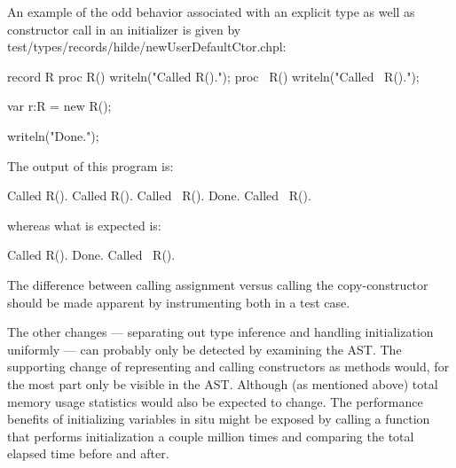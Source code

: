 An example of the odd behavior associated with an explicit type as well as constructor
call in an initializer is given by test/types/records/hilde/newUserDefaultCtor.chpl:
\begin{chapel}
record R
{
  proc R() { writeln("Called R()."); }
  proc ~R() { writeln("Called ~R()."); }
}

var r:R = new R();

writeln("Done.");
\end{chapel}
The output of this program is:
\begin{chapelprintoutput}
Called R().
Called R().
Called ~R().
Done.
Called ~R().
\end{chapelprintoutput}
\noindent
whereas what is expected is:
\begin{chapelprintoutput}
Called R().
Done.
Called ~R().
\end{chapelprintoutput}


The difference between calling assignment versus calling the copy-constructor should be
made apparent by instrumenting both in a test case.

The other changes --- separating out type inference and handling initialization uniformly
--- can probably only be detected by examining the AST.  The supporting change of
representing and calling constructors as methods would, for the most part only be visible
in the AST.  Although (as mentioned above) total memory usage statistics would also be
expected to change.  The performance benefits of initializing variables in situ might be
exposed by calling a function that performs initialization a couple million times and
comparing the total elapsed time before and after.

